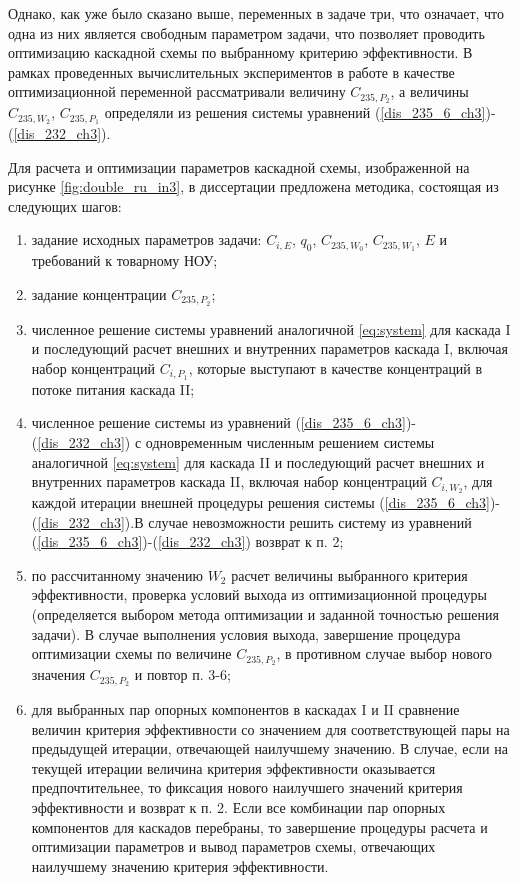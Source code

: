 Однако, как уже было сказано выше, переменных в задаче три, что означает, что одна из них является свободным параметром задачи, что позволяет проводить оптимизацию каскадной схемы по выбранному критерию эффективности. В рамках проведенных вычислительных экспериментов в работе в качестве оптимизационной переменной рассматривали величину $C_{235,{P_2}}$, а величины $C_{235,{W_2}}$, $C_{235,{P_1}}$ определяли из решения системы уравнений (\ref{dis_235_6_ch3})-(\ref{dis_232_ch3}).  

Для расчета и оптимизации параметров каскадной схемы, изображенной на рисунке \ref{fig:double_ru_in3}, в диссертации предложена методика, состоящая из следующих шагов:

\begin{enumerate}
    \item задание исходных параметров задачи: $C_{i,E}$, $q_0$, $C_{235,{W_0}}$, $C_{235,{W_1}}$, $E$ и требований к товарному НОУ;
    \item задание концентрации $C_{235,{P_2}}$;
    \item численное решение системы уравнений аналогичной \ref{eq:system} для каскада I и последующий расчет внешних и внутренних параметров каскада I, включая набор концентраций $C_{i,{P_1}}$, которые выступают в качестве концентраций в потоке питания каскада II;
    \item численное решение системы из уравнений (\ref{dis_235_6_ch3})-(\ref{dis_232_ch3}) с одновременным численным решением системы аналогичной \ref{eq:system} для каскада II и последующий расчет внешних и внутренних параметров каскада II, включая набор концентраций $C_{i,{W_2}}$, для каждой итерации внешней процедуры решения системы (\ref{dis_235_6_ch3})-(\ref{dis_232_ch3}).В случае невозможности решить систему из уравнений (\ref{dis_235_6_ch3})-(\ref{dis_232_ch3}) возврат к п. 2;
    \item по рассчитанному значению $W_2$ расчет величины выбранного критерия эффективности, проверка условий выхода из оптимизационной процедуры (определяется выбором метода оптимизации и заданной точностью решения задачи). В случае выполнения условия выхода, завершение процедура оптимизации схемы по величине  $C_{235,{P_2}}$, в противном случае выбор нового значения $C_{235,{P_2}}$ и повтор п. 3-6;
    \item для выбранных пар опорных компонентов в каскадах I и II сравнение величин критерия эффективности со значением для соответствующей пары на предыдущей итерации, отвечающей наилучшему значению. В случае, если на текущей итерации величина критерия эффективности оказывается предпочтительнее, то фиксация нового наилучшего значений критерия эффективности и возврат к п. 2. Если все комбинации пар опорных компонентов для каскадов перебраны, то завершение процедуры расчета и оптимизации параметров и вывод параметров схемы, отвечающих наилучшему значению критерия эффективности. 
\end{enumerate}

